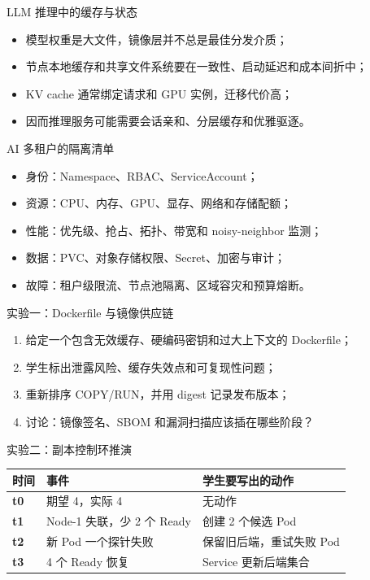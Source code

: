 \documentclass[UTF8,fontset=none,aspectratio=169,10pt]{beamer}
\begin{document}
\begin{frame}{LLM 推理中的缓存与状态}
\begin{itemize}
  \item 模型权重是大文件，镜像层并不总是最佳分发介质；
  \item 节点本地缓存和共享文件系统要在一致性、启动延迟和成本间折中；
  \item KV cache 通常绑定请求和 GPU 实例，迁移代价高；
  \item 因而推理服务可能需要会话亲和、分层缓存和优雅驱逐。
\end{itemize}
\vfill
{}
\end{frame}

\begin{frame}{AI 多租户的隔离清单}
\begin{itemize}
  \item 身份：Namespace、RBAC、ServiceAccount；
  \item 资源：CPU、内存、GPU、显存、网络和存储配额；
  \item 性能：优先级、抢占、拓扑、带宽和 noisy-neighbor 监测；
  \item 数据：PVC、对象存储权限、Secret、加密与审计；
  \item 故障：租户级限流、节点池隔离、区域容灾和预算熔断。
\end{itemize}
\end{frame}


\begin{frame}{实验一：Dockerfile 与镜像供应链}
\begin{enumerate}
  \item 给定一个包含无效缓存、硬编码密钥和过大上下文的 Dockerfile；
  \item 学生标出泄露风险、缓存失效点和可复现性问题；
  \item 重新排序 COPY/RUN，并用 digest 记录发布版本；
  \item 讨论：镜像签名、SBOM 和漏洞扫描应该插在哪些阶段？
\end{enumerate}
\vfill
{}
\end{frame}

\begin{frame}{实验二：副本控制环推演}
\begin{tabularx}{\linewidth}{>{\bfseries}p{3.2cm}XX}
\toprule
时间 & 事件 & 学生要写出的动作 \\
\midrule
t0 & 期望 4，实际 4 & 无动作 \\
t1 & Node-1 失联，少 2 个 Ready & 创建 2 个候选 Pod \\
t2 & 新 Pod 一个探针失败 & 保留旧后端，重试失败 Pod \\
t3 & 4 个 Ready 恢复 & Service 更新后端集合 \\
\bottomrule
\end{tabularx}
\vfill
{}
\end{frame}
\end{document}
